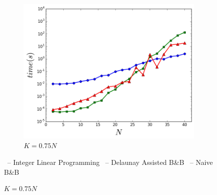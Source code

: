 \begin{figure}[t]
\begin{center}
\begin{subfigure}[b]{0.3\linewidth}
		\includegraphics[width=0.9\linewidth]{Pictures/k3} 
		\caption{$K=0.75N$} 
		\label{fig:fixed_k:c} 
	\end{subfigure}
	\end{center}
	\begin{center}
	\footnotesize
    \textcolor{blue}{\cmark}\ -- Integer Linear Programming \textcolor{red}{\tmark}\ -- Delaunay Assisted B\&B \textcolor{green}{\smark}\ -- Naive B\&B
    \end{center}
\end{figure}

